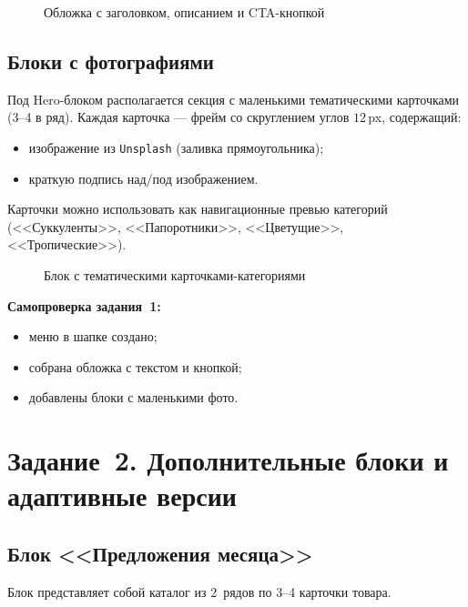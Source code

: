 \begin{figure}[h]
  \centering
  \caption{Обложка с заголовком, описанием и CTA-кнопкой}
  \label{fig:hero}
\end{figure}

\subsection{Блоки с фотографиями}

Под Hero-блоком располагается секция с маленькими тематическими
карточками (3--4 в ряд). Каждая карточка --- фрейм со скруглением углов
\(12\,\)px, содержащий:
\begin{itemize}
  \item изображение из \texttt{Unsplash} (заливка прямоугольника);
  \item краткую подпись над/под изображением.
\end{itemize}
Карточки можно использовать как навигационные превью категорий
(<<Суккуленты>>, <<Папоротники>>, <<Цветущие>>, <<Тропические>>).

\begin{figure}[h]
  \centering
  \caption{Блок с тематическими карточками-категориями}
  \label{fig:gallery}
\end{figure}

\textbf{Самопроверка задания~1:}
\begin{itemize}
  \item меню в шапке создано;
  \item собрана обложка с текстом и кнопкой;
  \item добавлены блоки с маленькими фото.
\end{itemize}

\section{Задание~2. Дополнительные блоки и адаптивные версии}

\subsection{Блок <<Предложения месяца>>}

Блок представляет собой каталог из 2~рядов по 3--4 карточки товара.


